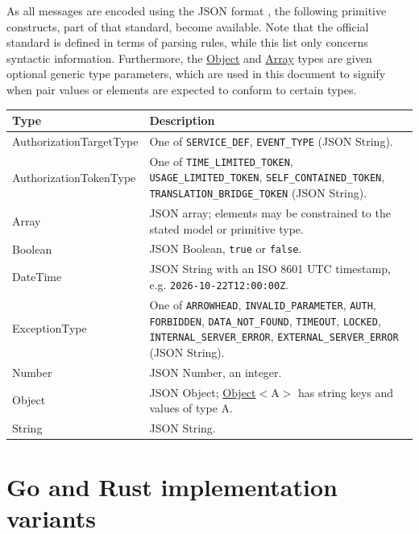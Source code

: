 \documentclass[a4paper]{arrowhead}
\newcommand{\pdef}[1]{{\textcolor{ArrowheadGrey}{#1 \label{sec:model:primitives:#1} \label{sec:model:primitives:#1s}}}}
\newcommand{\pref}[1]{{\textcolor{ArrowheadGrey}{\hyperref[sec:model:primitives:#1]{#1}}}}
\begin{document}
As all messages are encoded using the JSON format \cite{rfc8259}, the following primitive constructs, part of that standard, become available.
Note that the official standard is defined in terms of parsing rules, while this list only concerns syntactic information.
Furthermore, the \pref{Object} and \pref{Array} types are given optional generic type parameters, which are used in this document to signify when pair values or elements are expected to conform to certain types.

\noindent\begin{tabularx}{\textwidth}{| p{4.6cm} | X |} \hline
\rowcolor{gray!33} Type & Description \\ \hline
\pdef{AuthorizationTargetType} & One of \texttt{SERVICE\_\allowbreak{}DEF}, \texttt{EVENT\_\allowbreak{}TYPE} (JSON String). \\ \hline
\pdef{AuthorizationTokenType} & One of \texttt{TIME\_\allowbreak{}LIMITED\_\allowbreak{}TOKEN}, \texttt{USAGE\_\allowbreak{}LIMITED\_\allowbreak{}TOKEN}, \texttt{SELF\_\allowbreak{}CONTAINED\_\allowbreak{}TOKEN}, \texttt{TRANSLATION\_\allowbreak{}BRIDGE\_\allowbreak{}TOKEN} (JSON String). \\ \hline
\pdef{Array} & JSON array; elements may be constrained to the stated model or primitive type. \\ \hline
\pdef{Boolean} & JSON Boolean, \texttt{true} or \texttt{false}. \\ \hline
\pdef{DateTime} & JSON String with an ISO 8601 UTC timestamp, e.g. \texttt{2026-10-22T12:00:00Z}. \\ \hline
\pdef{ExceptionType} & One of \texttt{ARROWHEAD}, \texttt{INVALID\_\allowbreak{}PARAMETER}, \texttt{AUTH}, \texttt{FORBIDDEN}, \texttt{DATA\_\allowbreak{}NOT\_\allowbreak{}FOUND}, \texttt{TIMEOUT}, \texttt{LOCKED}, \texttt{INTERNAL\_\allowbreak{}SERVER\_\allowbreak{}ERROR}, \texttt{EXTERNAL\_\allowbreak{}SERVER\_\allowbreak{}ERROR} (JSON String). \\ \hline
\pdef{Number} & JSON Number, an integer. \\ \hline
\pdef{Object} & JSON Object; \pref{Object}$<$A$>$ has string keys and values of type A. \\ \hline
\pdef{String} & JSON String. \\ \hline
\end{tabularx}

\newpage

\section{Go and Rust implementation variants}
\end{document}
